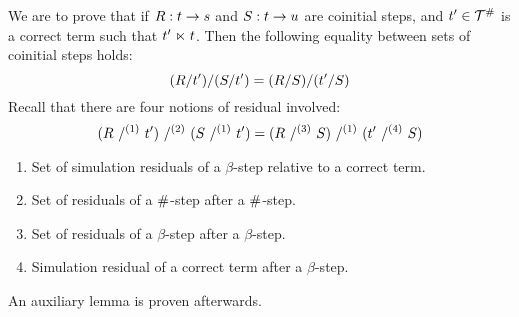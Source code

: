 We are to prove that if
 $R : t \to s$ and $S : t \to u$ are coinitial steps,
and $t' \in \mathcal{T}^{\mathtt{\#}}$ is a correct term such that $t' \mathrel{\ltimes} t$.
Then the following equality between sets of coinitial steps holds:
\[
  (R/t')/(S/t') = (R/S)/(t'/S)
\]
Recall that there are four notions of residual involved:
\[
  (\redex\ /^{(1)}\ \tm')\ /^{(2)}\ (\redextwo\ /^{(1)}\ \tm') = (\redex\ /^{(3)}\ \redextwo)\ /^{(1)}\ (\tm'\ /^{(4)}\ \redextwo)
\]
\begin{enumerate}
\item Set of simulation residuals of a $\beta$-step relative to a correct term.
\item Set of residuals of a $\mathtt{\#}$-step after a $\mathtt{\#}$-step.
\item Set of residuals of a $\beta$-step after a $\beta$-step.
\item Simulation residual of a correct term after a $\beta$-step.
\end{enumerate}
An auxiliary lemma is proven afterwards.


